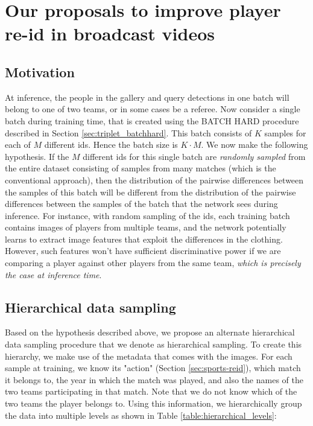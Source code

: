 \documentclass{article}
\begin{document}
\section {Our proposals to improve player re-id in broadcast videos}

\subsection{Motivation}










At inference, the people in the gallery and query detections in one batch will belong to one of two teams, or in some cases be a referee. Now consider a single batch during training time, that is created using the BATCH HARD procedure \cite{hermans2017defense} described in Section \ref{sec:triplet_batchhard}. This batch consists of $K$ samples for each of $M$ different ids. Hence the batch size is $K\cdot M$. We now make the following hypothesis. If the $M$ different ids for this single batch are \emph{randomly sampled} from the entire dataset consisting of samples from many matches (which is the conventional approach), then the distribution of the pairwise differences between the samples of this batch will be different from the distribution of the pairwise differences between the samples of the batch that the network sees during inference. For instance, with random sampling of the ids, each training batch contains images of players from multiple teams, and the network potentially learns to extract image features that exploit the differences in the clothing. However, such features won't have sufficient discriminative power if we are comparing a player against other players from the same team, \emph{which is precisely the case at inference time}.



\subsection{Hierarchical data sampling}
Based on the hypothesis described above, we propose an alternate hierarchical data sampling procedure that we denote as hierarchical sampling. To create this hierarchy, we make use of the metadata that comes with the images. For each sample at training, we know its "action" (Section \ref{sec:sports-reid}), which match it belongs to, the year in which the match was played, and also the names of the two teams participating in that match. Note that we do not know which of the two teams the player belongs to. Using this information, we hierarchically group the data into multiple levels as shown in Table \ref{table:hierarchical_levels}: 
\end{document}
